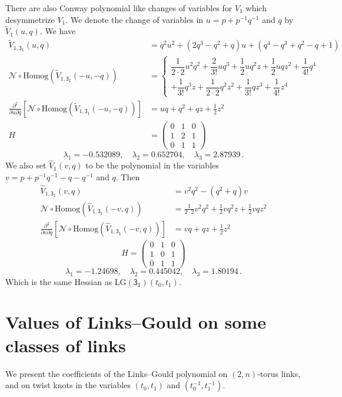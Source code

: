\documentclass[12pt,reqno]{amsart}
\theoremstyle{definition}
\def\LG{\mathrm{LG}}
\def\homog{\mathrm{Homog}}
\def\normal{\mathcal{N}}
\begin{document}
There are also Conway polynomial like changes of variables for $V_1$ which desymmetrize $V_1$. We denote the change of variables in $u = p + p^{-1}q^{-1}$ and $q$ by $\tilde V_1(u,q)$. We have
\begin{align*}
    \tilde V_{1,\mathsf{3_1}}(u,q) &= q^2u^2 + (2q^3-q^2+q)u + (q^4-q^3+q^2-q+1)
    \\
    \normal\circ\homog (\tilde V_{1,\mathsf{3_1}}(-u,-q)) &= 
    \left\lbrace
    \begin{matrix}
        \dfrac{1}{2\cdot 2} u^2q^2 + 
    \dfrac{2}{3!}uq^3+\dfrac{1}{2}uq^2z+\dfrac{1}{2}uqz^2 +\dfrac{1}{4!}q^4
    \\[2ex]
    +\dfrac{1}{3!}q^3z+\dfrac{1}{2\cdot 2}q^2z^2+\dfrac{1}{3!}qz^3+\dfrac{1}{4!}z^4
    \end{matrix}
    \right.
    \\
    \frac{\partial^2}{\partial u \partial q }[\normal\circ\homog (\tilde V_{1,\mathsf{3_1}}(-u,-q))]
    &=uq+q^2+qz+\frac{1}{2}z^2
    \\
    H&=\begin{pmatrix} 0&1&0\\1&2&1\\0&1&1
\end{pmatrix}
\end{align*}
\[\lambda_1=-0.532089,\quad
\lambda_2= 0.652704,\quad
\lambda_3= 2.87939\,.\]
We also set $\hat V_1(v,q)$ to be the polynomial in the variables $v = p + p^{-1}q^{-1} - q - q^{-1}$ and $q$. Then
\begin{align*}
    \hat V_{1,\mathsf{3_1}}(v,q) &= v^2q^2 - (q^2+q)v
    \\
    \normal\circ\homog (\hat V_{1,\mathsf{3_1}}(-v,q)) &= \frac{1}{2\cdot 2}v^2q^2  +\frac{1}{2}vq^2z+\frac{1}{2}vqz^2
    \\
    \frac{\partial^2}{\partial v \partial q}[\normal\circ\homog (\hat V_{1,\mathsf{3_1}}(-v,q))]&=vq + qz + \frac{1}{2}z^2
\end{align*}
\[H=\begin{pmatrix} 0&1&0\\1&0&1\\0&1&1
\end{pmatrix}\]
\[\lambda_1=-1.24698, 
    \quad 
    \lambda_2=0.445042,
    \quad
    \lambda_3=1.80194\,.\]
Which is the same Hessian as $\LG(\mathsf{3_1})(t_0,t_1)$.

\section{Values of Links--Gould on some classes of links}\label{sec.values}
We present the coefficients of the Links--Gould polynomial on $(2,n)$-torus links, and on twist knots in the variables $(t_0,t_1)$ and $(t_0^{-1},t_1^{-1})$.
\end{document}
